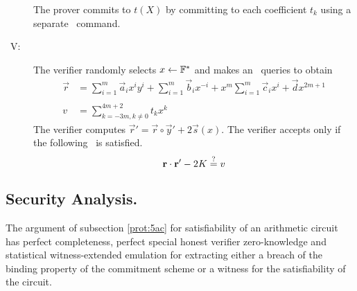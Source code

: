 \begin{description}
The prover commits to $t(X)$ by committing to each coefficient $t_k$ using a separate \ILCcommit\ command.

\item[\ V:] The verifier randomly selects $x\gets \mathbb{F}^*$ and makes an \ILCopen\ queries to obtain
\begin{align*}
\vec{r} &= \sum_{i=1}^m\vec{a}_{i}x^{i} y^i+\sum_{i=1}^m\vec{b}_{i} x^{-i}+x^m \sum_{i=1}^m\vec{c}_{i} x^{i}+\vec{d}x^{2m+1}\\ \\
v &= \sum_{k=-3m,k \neq 0}^{4m+2}t_k x^{k}
\end{align*}
The verifier computes $\vec{r}'=\vec{r}\circ \vec{y}' +2\vec{s}(x)$. The verifier accepts only if the following \ILCcheck\ is satisfied.
$$\mathbf{r}\cdot \mathbf{r}'-2K \overset{?}{=} v$$
\end{description}

\subsection{Security Analysis.}
\begin{thm}\label{th:mainAC}
The argument of subsection \ref{prot:5ac} for satisfiability of an arithmetic circuit has perfect completeness, perfect special honest verifier zero-knowledge and statistical witness-extended emulation for extracting either a breach of the binding property of the commitment scheme or a witness for the satisfiability of the circuit.
\end{thm}

